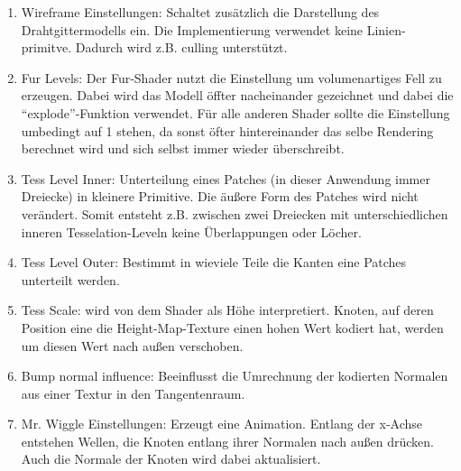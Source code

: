 \documentclass[a4paper,12pt]{article}
\begin{document}
\begin{enumerate}
\item Wireframe Einstellungen: Schaltet zusätzlich die Darstellung des Drahtgittermodells ein. Die Implementierung verwendet keine Linien-primitve. Dadurch wird z.B. culling unterstützt.
\item Fur Levels: Der Fur-Shader nutzt die Einstellung um volumenartiges Fell zu erzeugen. Dabei wird das Modell öffter nacheinander gezeichnet und dabei die "`explode"'-Funktion verwendet. Für alle anderen Shader sollte die Einstellung umbedingt auf 1 stehen, da sonst öfter hintereinander das selbe Rendering berechnet wird und sich selbst immer wieder überschreibt.
\item Tess Level Inner: Unterteilung eines Patches (in dieser Anwendung immer Dreiecke) in kleinere Primitive. Die äußere Form des Patches wird nicht verändert. Somit entsteht z.B. zwischen zwei Dreiecken mit unterschiedlichen inneren Tesselation-Leveln keine Überlappungen oder Löcher.
\item Tess Level Outer: Bestimmt in wieviele Teile die Kanten eine Patches unterteilt werden.
\item Tess Scale: wird von dem Shader als Höhe interpretiert. Knoten, auf deren Position eine die Height-Map-Texture einen hohen Wert kodiert hat, werden um diesen Wert nach außen verschoben.
\item Bump normal influence: Beeinflusst die Umrechnung der kodierten Normalen aus einer Textur in den Tangentenraum.
\item Mr. Wiggle Einstellungen: Erzeugt eine Animation. Entlang der x-Achse entstehen Wellen, die Knoten entlang ihrer Normalen nach außen drücken. Auch die Normale der Knoten wird dabei aktualisiert.
\end{enumerate}
\end{document}
